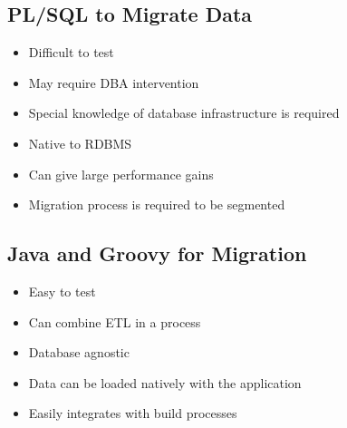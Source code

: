 \documentclass[12pt,notitlepage]{article}
\begin{document}
\begin{s5presentation}
  \W \begin{s5slide}
    \W \section{PL/SQL to Migrate Data}
    \begin{itemize}
      \item Difficult to test
      \item May require DBA intervention
      \item Special knowledge of database infrastructure is required
      \item Native to RDBMS
      \item Can give large performance gains
      \item Migration process is required to be segmented
    \end{itemize}
  \W \end {s5slide}

  \W \begin{s5slide}
    \W \section{Java and Groovy for Migration}
    \begin{itemize}
      \item Easy to test
      \item Can combine ETL in a process
      \item Database agnostic
      \item Data can be loaded natively with the application
      \item Easily integrates with build processes
    \end{itemize}
  \W \end {s5slide}

  \W \end{s5presentation}
\end{document}
